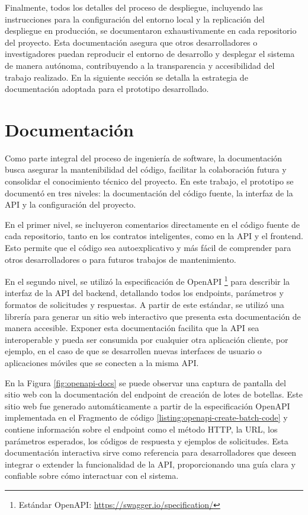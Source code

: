Finalmente, todos los detalles del proceso de despliegue, incluyendo las instrucciones para la configuración del entorno local y la replicación del despliegue en producción, se documentaron exhaustivamente en cada repositorio del proyecto. Esta documentación asegura que otros desarrolladores o investigadores puedan reproducir el entorno de desarrollo y desplegar el sistema de manera autónoma, contribuyendo a la transparencia y accesibilidad del trabajo realizado. En la siguiente sección se detalla la estrategia de documentación adoptada para el prototipo desarrollado.

\section{Documentación}
\label{sec:documentation}

Como parte integral del proceso de ingeniería de software, la documentación busca asegurar la mantenibilidad del código, facilitar la colaboración futura y consolidar el conocimiento técnico del proyecto. En este trabajo, el prototipo se documentó en tres niveles: la documentación del código fuente, la interfaz de la API y la configuración del proyecto.

En el primer nivel, se incluyeron comentarios directamente en el código fuente de cada repositorio, tanto en los contratos inteligentes, como en la API y el frontend. Esto permite que el código sea autoexplicativo y más fácil de comprender para otros desarrolladores o para futuros trabajos de mantenimiento. 

En el segundo nivel, se utilizó la especificación de OpenAPI \footnote{Estándar OpenAPI: \url{https://swagger.io/specification/}} para describir la interfaz de la API del backend, detallando todos los endpoints, parámetros y formatos de solicitudes y respuestas. A partir de este estándar, se utilizó una librería para generar un sitio web interactivo que presenta esta documentación de manera accesible. Exponer esta documentación facilita que la API sea interoperable y pueda ser consumida por cualquier otra aplicación cliente, por ejemplo, en el caso de que se desarrollen nuevas interfaces de usuario o aplicaciones móviles que se conecten a la misma API. 

En la Figura \ref{fig:openapi-docs} se puede observar una captura de pantalla del sitio web con la documentación del endpoint de creación de lotes de botellas. Este sitio web fue generado automáticamente a partir de la especificación OpenAPI implementada en el Fragmento de código \ref{listing:openapi-create-batch-code} y contiene información sobre el endpoint como el método HTTP, la URL, los parámetros esperados, los códigos de respuesta y ejemplos de solicitudes. Esta documentación interactiva sirve como referencia para desarrolladores que deseen integrar o extender la funcionalidad de la API, proporcionando una guía clara y confiable sobre cómo interactuar con el sistema.

